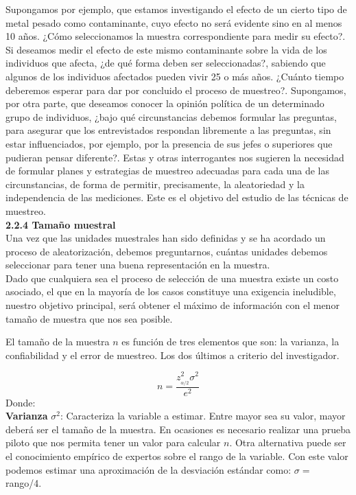 \documentclass[base=hide,11pt]{elegantbook}
\begin{document}
Supongamos por ejemplo, que estamos investigando el efecto de un cierto tipo de metal pesado como contaminante, cuyo efecto no será evidente sino en al menos 10 años. ¿Cómo seleccionamos  la muestra correspondiente para medir su efecto?. Si deseamos medir el efecto de este mismo contaminante sobre la vida de los individuos que afecta, ¿de qué forma deben ser seleccionadas?, sabiendo que algunos de los individuos afectados pueden vivir 25 o más años. ¿Cuánto tiempo deberemos esperar para dar por concluido el proceso de muestreo?. Supongamos, por otra parte, que deseamos conocer la opinión política de un determinado grupo de individuos, ¿bajo qué circunstancias debemos formular las preguntas, para asegurar que los entrevistados respondan libremente a las preguntas, sin estar influenciados, por ejemplo, por la presencia de sus jefes o superiores que pudieran pensar diferente?. Estas y otras interrogantes nos sugieren la necesidad de formular planes y estrategias de muestreo adecuadas para cada una de las circunstancias, de forma de permitir, precisamente, la aleatoriedad y la independencia de las mediciones. Este es el objetivo del estudio de las técnicas de muestreo.\\
		
\textcolor{col4}{\bf 2.2.4 Tamaño muestral}\\
Una vez que las unidades muestrales han sido definidas y se ha acordado un proceso de aleatorización, debemos preguntarnos, cuántas unidades debemos seleccionar para tener una buena representación en la  muestra.\\
		
Dado que cualquiera sea el proceso de selección de una muestra existe un costo asociado, el que en la mayoría de los casos constituye una exigencia ineludible, nuestro objetivo principal, será obtener el máximo de información con el menor tamaño de muestra que nos sea posible.
		
El tamaño de la muestra $n$ es función de tres elementos que son: la varianza, la confiabilidad y el error de muestreo. Los dos últimos a criterio del investigador.
		
		$$n=\dfrac{z^{2}_{_{\alpha/2}} \sigma^{2}}{e^{2}}$$
Donde: \\


\textcolor{col4}{\bf \large Varianza} $\sigma^{2}$:  Caracteriza la variable a estimar. Entre mayor sea su valor, mayor deberá ser el tamaño de la muestra. En ocasiones es necesario realizar una prueba piloto que nos permita tener un valor para calcular $n$. Otra alternativa puede ser el conocimiento empírico de expertos sobre el rango de la variable. Con este valor podemos estimar una aproximación de la desviación estándar como: $\sigma =$ rango/4. 
\end{document}
